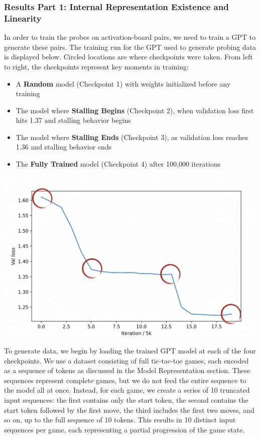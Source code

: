 \documentclass[11pt]{article}
\providecommand{\tightlist}{%
      \setlength{\itemsep}{0pt}\setlength{\parskip}{0pt}}
\begin{document}
    \subsubsection{Results Part 1: Internal Representation Existence and
Linearity}\label{results-part-1-internal-representation-existence-and-linearity}

In order to train the probes on activation-board pairs, we need to train
a GPT to generate these pairs. The training run for the GPT used to
generate probing data is displayed below. Circled locations are where
checkpoints were taken. From left to right, the checkpoints represent
key moments in training:

\begin{itemize}
\tightlist
\item
  A \textbf{Random} model (Checkpoint 1) with weights initialized before
  any training
\item
  The model where \textbf{Stalling Begins} (Checkpoint 2), when
  validation loss first hits 1.37 and stalling behavior begins
\item
  The model where \textbf{Stalling Ends} (Checkpoint 3), as validation
  loss reaches 1.36 and stalling behavior ends
\item
  The \textbf{Fully Trained} model (Checkpoint 4) after 100,000
  iterations
\end{itemize}

\begin{center}
\includegraphics[width=1\textwidth,keepaspectratio]{inserted_images/checkpoint_locs.png}
\end{center} 

    To generate data, we begin by loading the trained GPT model at each of
the four checkpoints. We use a dataset consisting of full tic-tac-toe
games, each encoded as a sequence of tokens as discussed in the Model
Representation section. These sequences represent complete games, but we
do not feed the entire sequence to the model all at once. Instead, for
each game, we create a series of 10 truncated input sequences: the first
contains only the start token, the second contains the start token
followed by the first move, the third includes the first two moves, and
so on, up to the full sequence of 10 tokens. This results in 10 distinct
input sequences per game, each representing a partial progression of the
game state.
\end{document}
